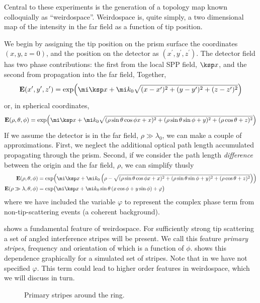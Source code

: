 Central to these experiments is the generation of a topology map known
colloquially as ``weirdospace''.  Weirdospace is, quite simply, a two
dimensional map of the intensity in the far field as a function of tip position.

We begin by assigning the tip position on the prism surface the coordinates
$(x,y,z=0)$, and the position on the detector as
$(x^\prime,y^\prime,z^\prime)$.  The detector field has two phase
contributions: the first from the local SPP field, $\ksp x$, and the second
from propagation into the far field, Together,
\begin{equation}
\mathbf{E}(x^\prime,y^\prime,z^\prime) = \exp\!\left( \mi\ksp x + %
\mi k_0\sqrt{ (x-x^\prime)^2+ (y-y^\prime)^2+ (z-z^\prime)^2 } \right)
\end{equation}
or, in spherical coordinates,
\begin{equation}
\mathbf{E}(\rho,\theta,\phi) = \exp\!\left( \mi\ksp x + %
\mi k_0\sqrt{
(\rho\sin\theta\cos\phi x+x)^2+(\rho\sin\theta\sin\phi+y)^2+(\rho\cos\theta+z)^2 } \right)
\label{eqn:dingusthusly}
\end{equation}
If we assume the detector is in the far field, $\rho\gg\lambda_0$, we can
make a couple of approximations.  First, we neglect the additional optical
path length accumulated propagating through the prism.  Second, if we
consider the path length \textit{difference} between the origin and the far field,
$\rho$, we can simplify  thusly
\begin{align}
\mathbf{E}(\rho,\theta,\phi) &= \exp\!\left( \mi\ksp x + %
\mi k_0\left(\rho-\sqrt{ (\rho\sin\theta\cos\phi x+x)^2+(\rho\sin\theta\sin\phi+y)^2+(\rho\cos\theta+z)^2
}\right) \right)\\
\mathbf{E}(\rho\gg\lambda,\theta,\phi) &= \exp\!\big( \mi \ksp x
 + \mi k_0 \sin\theta \left(x\cos\phi+y\sin\phi\right)
 + \varphi\big)
	\label{eqn:primarystripes}
\end{align}
where we have included the variable $\varphi$ to represent the complex phase term
from non-tip-scattering events (a coherent background).

 shows a fundamental feature of weirdospace.
For sufficiently strong tip scattering a set of angled interference stripes
will be present.  We call this feature \textit{primary stripes},
frequency and orientation of which is a function of $\phi$.
 shows this
dependence graphically for a simulated set of stripes.  Note that in
 we have not specified $\varphi$.  This term
could lead to higher order features in weirdospace, which we will discuss
in turn.
\begin{figure}
\centering
\caption{Primary stripes around the ring.}
\label{fig:primarystripes}
\end{figure}
